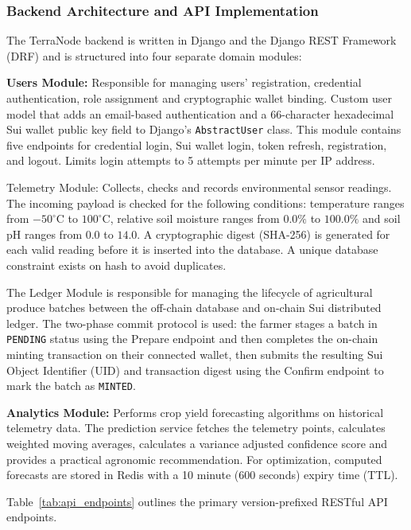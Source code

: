 \subsubsection*{Backend Architecture and API Implementation}

The TerraNode backend is written in Django and the Django REST Framework (DRF) and is structured into four separate domain modules:

\textbf{Users Module:} Responsible for managing users' registration, credential authentication, role assignment and cryptographic wallet binding. Custom user model that adds an email-based authentication and a 66-character hexadecimal Sui wallet public key field to Django's \texttt{AbstractUser} class. This module contains five endpoints for credential login, Sui wallet login, token refresh, registration, and logout. Limits login attempts to 5 attempts per minute per IP address.

Telemetry Module: Collects, checks and records environmental sensor readings. The incoming payload is checked for the following conditions: temperature ranges from $-50^\circ$C to $100^\circ$C, relative soil moisture ranges from $0.0\%$ to $100.0\%$ and soil pH ranges from $0.0$ to $14.0$. A cryptographic digest (SHA-256) is generated for each valid reading before it is inserted into the database. A unique database constraint exists on hash to avoid duplicates.

The Ledger Module is responsible for managing the lifecycle of agricultural produce batches between the off-chain database and on-chain Sui distributed ledger. The two-phase commit protocol is used: the farmer stages a batch in \texttt{PENDING} status using the Prepare endpoint and then completes the on-chain minting transaction on their connected wallet, then submits the resulting Sui Object Identifier (UID) and transaction digest using the Confirm endpoint to mark the batch as \texttt{MINTED}.

\textbf{Analytics Module:} Performs crop yield forecasting algorithms on historical telemetry data. The prediction service fetches the telemetry points, calculates weighted moving averages, calculates a variance adjusted confidence score and provides a practical agronomic recommendation. For optimization, computed forecasts are stored in Redis with a 10 minute (600 seconds) expiry time (TTL).

Table~\ref{tab:api_endpoints} outlines the primary version-prefixed RESTful API endpoints.

